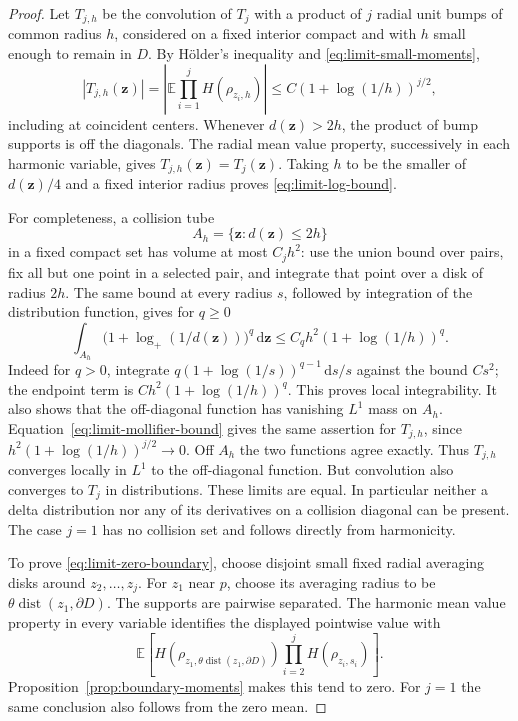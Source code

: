 \documentclass[11pt]{article}
\theoremstyle{definition}
\theoremstyle{remark}
\numberwithin{equation}{section}
\begin{document}
\begin{proof}
Let \(T_{j,h}\) be the convolution of \(T_j\) with a product of
\(j\) radial unit bumps of common radius \(h\), considered on a
fixed interior compact and with \(h\) small enough to remain in
\(D\).  By H\"older's inequality and
\eqref{eq:limit-small-moments},
\begin{equation}
 |T_{j,h}(\mathbf z)|
   =\left|\mathbb E\prod_{i=1}^jH(\rho_{z_i,h})\right|
   \le C(1+\log(1/h))^{j/2},
 \label{eq:limit-mollifier-bound}
\end{equation}
including at coincident centers.  Whenever \(d(\mathbf z)>2h\),
the product of bump supports is off the diagonals.  The radial mean
value property, successively in each harmonic variable, gives
\(T_{j,h}(\mathbf z)=T_j(\mathbf z)\).
Taking \(h\) to be the smaller of \(d(\mathbf z)/4\) and a fixed
interior radius proves \eqref{eq:limit-log-bound}.

For completeness, a collision tube
\[
       A_h=\{\mathbf z:d(\mathbf z)\le2h\}
\]
in a fixed compact set has volume at most \(C_jh^2\): use the
union bound over pairs, fix all but one point in a selected pair,
and integrate that point over a disk of radius \(2h\).
The same bound at every radius \(s\), followed by integration of
the distribution function, gives for \(q\ge0\)
\[
 \int_{A_h}\bigl(1+\log_+(1/d(\mathbf z))\bigr)^q\,\mathrm d\mathbf z
       \le C_qh^2(1+\log(1/h))^q.
\]
Indeed for \(q>0\), integrate
\(q(1+\log(1/s))^{q-1}\,\mathrm d s/s\) against the bound \(Cs^2\);
the endpoint term is \(Ch^2(1+\log(1/h))^q\).
This proves local integrability.  It also shows that the
off-diagonal function has vanishing \(L^1\) mass on \(A_h\).
Equation~\eqref{eq:limit-mollifier-bound} gives the same assertion
for \(T_{j,h}\), since \(h^2(1+\log(1/h))^{j/2}\to0\).
Off \(A_h\) the two functions agree exactly.  Thus \(T_{j,h}\)
converges locally in \(L^1\) to the off-diagonal function.
But convolution also converges to \(T_j\) in distributions.
These limits are equal.  In particular neither a delta distribution
nor any of its derivatives on a collision diagonal can be present.
The case \(j=1\) has no collision set and follows directly from
harmonicity.

To prove \eqref{eq:limit-zero-boundary}, choose disjoint small fixed
radial averaging disks around \(z_2,\ldots,z_j\).
For \(z_1\) near \(p\), choose its averaging radius to be
\(\theta\operatorname{dist}(z_1,\partial D)\).
The supports are pairwise separated.  The harmonic mean value
property in every variable identifies the displayed pointwise
value with
\[
 \mathbb E\left[H(\rho_{z_1,\theta\operatorname{dist}(z_1,\partial D)})
                         \prod_{i=2}^jH(\rho_{z_i,s_i})\right].
\]
Proposition~\ref{prop:boundary-moments} makes this tend to zero.
For \(j=1\) the same conclusion also follows from the zero mean.
\end{proof}
\end{document}
